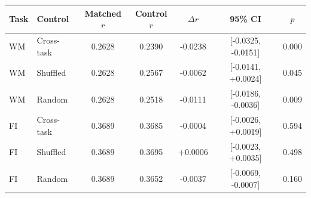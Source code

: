 \begin{tabular}{llccccc}
\toprule
Task & Control & Matched $r$ & Control $r$ & $\Delta r$ & 95\% CI & $p$ \\
\midrule
WM & Cross-task & 0.2628 & 0.2390 & -0.0238 & [-0.0325, -0.0151] & 0.000 \\
WM & Shuffled & 0.2628 & 0.2567 & -0.0062 & [-0.0141, +0.0024] & 0.045 \\
WM & Random & 0.2628 & 0.2518 & -0.0111 & [-0.0186, -0.0036] & 0.009 \\
\midrule
FI & Cross-task & 0.3689 & 0.3685 & -0.0004 & [-0.0026, +0.0019] & 0.594 \\
FI & Shuffled & 0.3689 & 0.3695 & +0.0006 & [-0.0023, +0.0035] & 0.498 \\
FI & Random & 0.3689 & 0.3652 & -0.0037 & [-0.0069, -0.0007] & 0.160 \\
\bottomrule
\end{tabular}